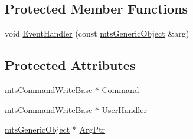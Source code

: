 \subsection*{Protected Member Functions}
\begin{DoxyCompactItemize}
\item 
void \hyperlink{classmts_event_receiver_write_a83c8f5bee880f41dbc9d812fa5a478a7}{Event\-Handler} (const \hyperlink{classmts_generic_object}{mts\-Generic\-Object} \&arg)
\end{DoxyCompactItemize}
\subsection*{Protected Attributes}
\begin{DoxyCompactItemize}
\item 
\hyperlink{classmts_command_write_base}{mts\-Command\-Write\-Base} $\ast$ \hyperlink{classmts_event_receiver_write_a60b0cbe48b277b5130576c5009b8851e}{Command}
\item 
\hyperlink{classmts_command_write_base}{mts\-Command\-Write\-Base} $\ast$ \hyperlink{classmts_event_receiver_write_a9ad8837c3e250203c0b0e8ce4112024d}{User\-Handler}
\item 
\hyperlink{classmts_generic_object}{mts\-Generic\-Object} $\ast$ \hyperlink{classmts_event_receiver_write_ac001e32506dc7feb428a18ae7d80bbe8}{Arg\-Ptr}
\end{DoxyCompactItemize}


